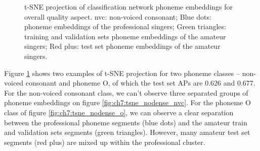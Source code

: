 \begin{figure}
    \centering
    \caption[]{t-SNE projection of classification network phoneme embeddings for overall quality aspect. nvc: non-voiced consonant; Blue dots: phoneme embeddings of the professional singers; Green triangles: training and validation sets phoneme embeddings of the amateur singers; Red plus: test set phoneme embeddings of the amateur singers.}
    \label{fig:ch7:tsne_nodense}
\end{figure}
    
Figure \ref{fig:ch7:tsne_nodense} shows two examples of \gls{t-SNE} projection for two phoneme classes -- non-voiced consonant and phoneme O, of which the test set \gls{AP}s are 0.626 and 0.677. For the non-voiced consonant class, we can't observe three separated groups of phoneme embeddings on figure \ref{fig:ch7:tsne_nodense_nvc}. For the phoneme O class of figure \ref{fig:ch7:tsne_nodense_o}, we can observe a clear separation between the professional phoneme segments (blue dots) and the amateur train and validation sets segments (green triangles). However, many amateur test set segments (red plus) are mixed up within the professional cluster. 

